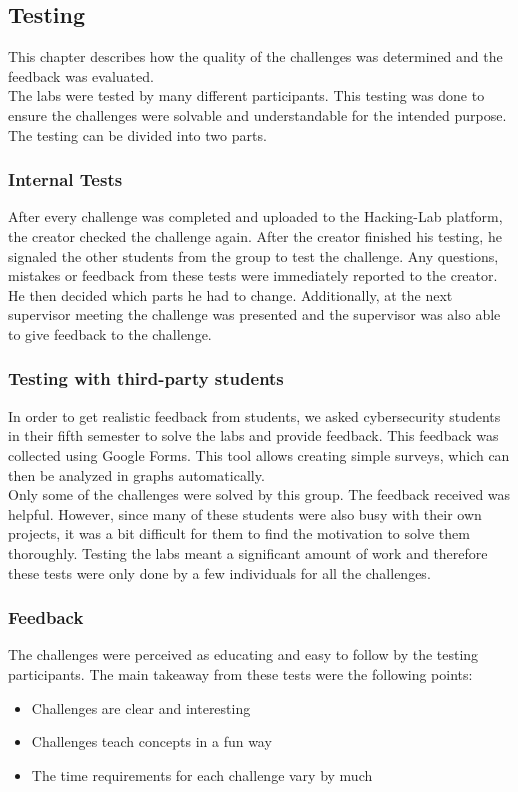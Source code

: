 \subsection{Testing}
\label{sec:testing}
This chapter describes how the quality of the challenges was determined and the feedback was evaluated. \\
The labs were tested by many different participants. This testing was done to ensure the challenges were solvable and understandable for the intended purpose. The testing can be divided into two parts.

\subsubsection{Internal Tests}
After every challenge was completed and uploaded to the Hacking-Lab platform, the creator checked the challenge again. After the creator finished his testing, he signaled the other students from the group to test the challenge. Any questions, mistakes or feedback from these tests were immediately reported to the creator. He then decided which parts he had to change. Additionally, at the next supervisor meeting the challenge was presented and the supervisor was also able to give feedback to the challenge.

\subsubsection{Testing with third-party students}
In order to get realistic feedback from students, we asked cybersecurity students in their fifth semester to solve the labs and provide feedback. This feedback was collected using Google Forms. This tool allows creating simple surveys, which can then be analyzed in graphs automatically. \\
Only some of the challenges were solved by this group. The feedback received was helpful. However, since many of these students were also busy with their own projects, it was a bit difficult for them to find the motivation to solve them thoroughly. Testing the labs meant a significant amount of work and therefore these tests were only done by a few individuals for all the challenges.

\subsubsection{Feedback}
The challenges were perceived as educating and easy to follow by the testing participants. The main takeaway from these tests were the following points:
\begin{itemize}
    \item Challenges are clear and interesting
    \item Challenges teach concepts in a fun way
    \item The time requirements for each challenge vary by much
  \end{itemize}

